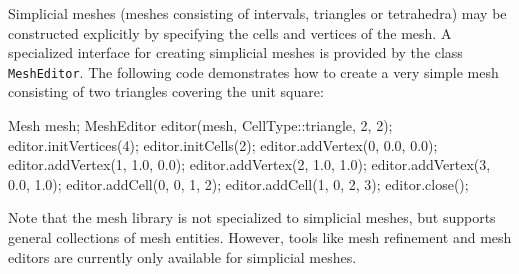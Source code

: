 Simplicial meshes (meshes consisting of intervals, triangles or
tetrahedra) may be constructed explicitly by specifying the
cells and vertices of the mesh. A specialized interface for creating
simplicial meshes is provided by the class \texttt{MeshEditor}.
The following code demonstrates how to create a very simple mesh
consisting of two triangles covering the unit square:
\begin{code}
  Mesh mesh;
  MeshEditor editor(mesh, CellType::triangle, 2, 2);
  editor.initVertices(4);
  editor.initCells(2);
  editor.addVertex(0, 0.0, 0.0);
  editor.addVertex(1, 1.0, 0.0);
  editor.addVertex(2, 1.0, 1.0);
  editor.addVertex(3, 0.0, 1.0);
  editor.addCell(0, 0, 1, 2);
  editor.addCell(1, 0, 2, 3);
  editor.close();
\end{code}
Note that the \dolfin{} mesh library is not specialized to simplicial
meshes, but supports general collections of mesh entities. However,
tools like mesh refinement and mesh editors are currently only
available for simplicial meshes.
